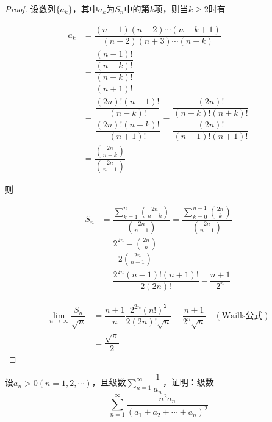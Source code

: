 \begin{proof}
    
    设数列$\{a_k\}$，其中$a_k$为$S_n$中的第$k$项，则当$k \geq 2$时有

    \begin{align*}
        a_k &= \dfrac{(n-1)(n-2)\cdots(n-k+1)}{(n+2)(n+3)\cdots(n+k)} \\
        & = \dfrac{\dfrac{(n-1)!}{(n-k)!}}{\dfrac{(n+k)!}{(n+1)!}} \\
        & = \dfrac{\dfrac{(2n)!(n-1)!}{(n-k)!}}{\dfrac{(2n)!(n+k)!}{(n+1)!}} = \dfrac{\dfrac{(2n)!}{(n-k)!(n+k)!}}{\dfrac{(2n)!}{(n-1)!(n+1)!}} \\
        & = \dfrac{\binom{2n}{n-k}}{\binom{2n}{n-1}}
    \end{align*}

    则
    
    \begin{align*}
        S_n &= \dfrac{\sum\limits_{k=1}^{n}{\binom{2n}{n-k}}}{\binom{2n}{n-1}} = \dfrac{\sum\limits_{k=0}^{n-1}{\binom{2n}{k}}}{\binom{2n}{n-1}} \\
        & = \dfrac{2^{2n} - \binom{2n}{n}}{2\binom{2n}{n-1}} \\
        & = \dfrac{2^{2n}(n-1)!(n+1)!}{2(2n)!} - \dfrac{n+1}{2^n}  
    \end{align*}

    \begin{align*}
        \lim_{n\to\infty}{\dfrac{S_n}{\sqrt{n}}} &= \dfrac{n+1}{n} \dfrac{2^{2n}(n!)^2}{2(2n)!\sqrt{n}} - \dfrac{n+1}{2^n\sqrt{n}} \quad (\mathrm{Waills}\mbox{公式}) \\
        & = \dfrac{\sqrt{\pi}}{2}
    \end{align*}

\end{proof}

\begin{proposition}
    
    设$a_n > 0(n = 1,2,\cdots)$，且级数$\sum\limits_{n=1}^{\infty}{\dfrac{1}{a_n}}$，证明：级数
    $$ \sum_{n=1}^{\infty}{\dfrac{n^2a_n}{(a_1 + a_2+ \cdots + a_n)^2}} $$

\end{proposition}

